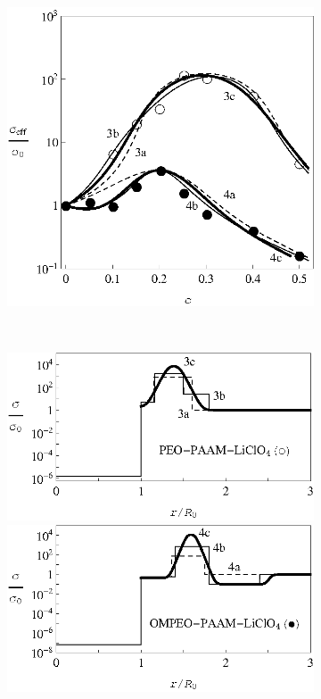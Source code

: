 \documentclass[14pt,twoside]{vakthesis}
\begin{document}
\begin{figure}[tb]
	\centering
	\begin{subfigure}[c]{0.54\textwidth}
		\includegraphics[width=\textwidth]{Fig3_PEO-PAAM_LiClO4_OMPEO-PAAM_LiClO4.eps}
		\caption{} \label{fig:OMPEO-LiClO4a}
	\end{subfigure}%
	~
	\begin{subfigure}[c]{0.45\textwidth}
		\includegraphics[width=\textwidth]{Fig3_PEO-PAAM_LiClO4_Profile.eps}
		\includegraphics[width=\textwidth]{Fig3_OMPEO-PAAM_LiClO4_Profile.eps}

\end{subfigure}
\end{figure}
\end{document}
